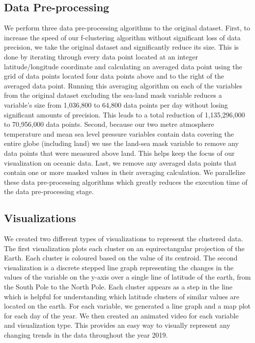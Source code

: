 \documentclass[conference,compsoc]{IEEEtran}
\begin{document}
\subsection{Data Pre-processing}

We perform three data pre-processing algorithms to the original dataset. First, to increase the speed of our f-clustering algorithm without significant loss of data precision, we take the original dataset and significantly reduce its size. This is done by iterating through every data point located at an integer latitude/longitude coordinate and calculating an averaged data point using the grid of data points located four data points above and to the right of the averaged data point. Running this averaging algorithm on each of the variables from the original dataset excluding the sea-land mask variable reduces a variable's size from 1,036,800 to 64,800 data points per day without losing significant amounts of precision. This leads to a total reduction of 1,135,296,000 to 70,956,000 data points. Second, because our two metre atmosphere temperature and mean sea level pressure variables contain data covering the entire globe (including land) we use the land-sea mask variable to remove any data points that were measured above land. This helps keep the focus of our visualization on oceanic data. Last, we remove any averaged data points that contain one or more masked values in their averaging calculation. We parallelize these data pre-processing algorithms which greatly reduces the execution time of the data pre-processing stage.

\subsection{Visualizations}

We created two different types of visualizations to represent the clustered data. The first visualization plots each cluster on an equirectangular projection of the Earth. Each cluster is coloured based on the value of its centroid. The second visualization is a discrete stepped line graph representing the changes in the values of the variable on the y-axis over a single line of latitude of the earth, from the South Pole to the North Pole. Each cluster appears as a step in the line which is helpful for understanding which latitude clusters of similar values are located on the earth. For each variable, we generated a line graph and a map plot for each day of the year. We then created an animated video for each variable and visualization type. This provides an easy way to visually represent any changing trends in the data throughout the year 2019.
\end{document}
